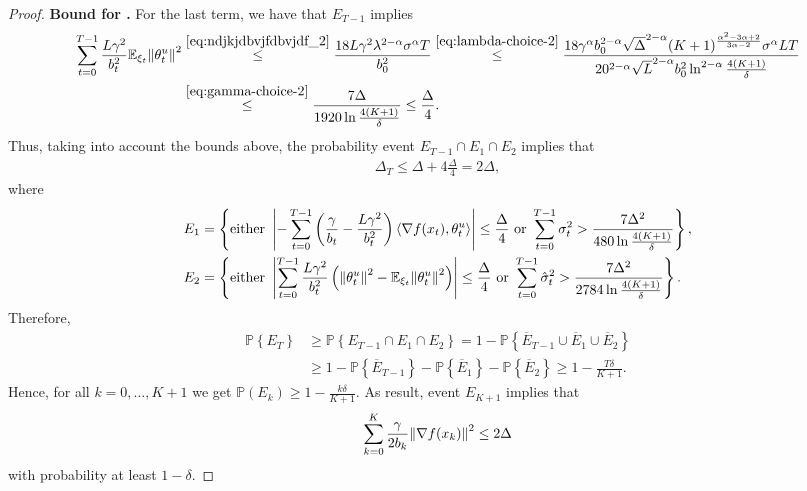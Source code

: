 \documentclass{article}
\begin{document}
\begin{proof}
    \textbf{Bound for \circledFour.} For the last term, we have that $E_{T-1}$ implies
    \begin{align*}
        \sum\limits_{t=0}^{T-1}\frac{L\gamma^2}{b_t^2} {\mathbb E}_{\xi_t}{\left\lVert\theta_t^u\right\rVert}^2 &\overset{\eqref{eq:ndjkjdbvjfdbvjdf_2}}{\leq} \frac{18L\gamma^2\lambda^{2 - \alpha}\sigma^\alpha T}{b_0^2} \overset{\eqref{eq:lambda-choice-2}}{\leq} \frac{18\gamma^\alpha b_0^{2-\alpha}\sqrt{\Delta}^{2-\alpha}(K+1)^{\frac{\alpha^2 - 3\alpha +2}{3\alpha -2}}\sigma^\alpha LT}{20^{2-\alpha}\sqrt{L}^{2 - \alpha}b_0^2 \ln^{2-\alpha}\frac{4(K+1)}{\delta}} \\
        &\overset{\eqref{eq:gamma-choice-2}}{\leq} 
        \frac{7\Delta}{1920\ln\frac{4(K+1)}{\delta}} \leq \frac{\Delta}{4}.
    \end{align*}
    Thus, taking into account the bounds above, the probability event $E_{T-1} \cap E_1 \cap E_2$ implies that
    \begin{align*}
       \Delta_T \leq \Delta + 4\frac{\Delta}{4} = 2\Delta,
    \end{align*}
    where
    \begin{align*}
        E_1 &= \left\{\text{either }\left|- \sum\limits_{t=0}^{T-1}\left(\frac{\gamma}{b_t} - \frac{L\gamma^2}{b_t^2}\right)\left \langle \nabla f(x_t), \theta_t^u \right \rangle\right| \leq \frac{\Delta}{4} \text{ or } \sum\limits_{t=0}^{T-1} \sigma_t^2 > \frac{7\Delta^2}{480\ln\frac{4(K+1)}{\delta}}\right\},\\
        E_2 &= \left\{\text{either }\left|\sum\limits_{t=0}^{T-1}\frac{L\gamma^2}{b_t^2}\left({\left\lVert\theta_t^u\right\rVert}^2 - {\mathbb E}_{\xi_t}{\left\lVert\theta_t^u\right\rVert}^2\right)\right| \leq \frac{\Delta}{4} \text{ or } \sum\limits_{t=0}^{T-1} \hat{\sigma}_t^2 > \frac{7\Delta^2}{2784\ln\frac{4(K+1)}{\delta}}\right\}.
    \end{align*}
    Therefore, 
    \begin{align*}
        \mathbb{P}\left\{E_T\right\} &\geq \mathbb{P}\left\{E_{T-1} \cap E_1 \cap E_2\right\}  = 1 - \mathbb{P}\left\{\overline{E}_{T-1} \cup \overline{E}_1 \cup \overline{E}_2\right\} \\&\geq 1 - \mathbb{P}\left\{\overline{E}_{T-1}\right\} - \mathbb{P}\left\{\overline{E}_1\right\} - \mathbb{P}\left\{\overline{E}_2\right\} \geq 1 - \frac{T\delta}{K+1}.
    \end{align*}
    Hence, for all $k = 0, \ldots, K+1$ we get $\mathbb{P}(E_k) \geq 1 - \frac{k\delta}{K+1}$. As  result, event $E_{K+1}$ implies that 
    \begin{align}
    \label{eq:total-nonconvex}
         \sum\limits_{k=0}^{K}\frac{\gamma}{2b_k}{\left\lVert\nabla f(x_k)\right\rVert}^2 \leq 2\Delta
    \end{align}
    with probability at least $1 - \delta$.


\end{proof}
\end{document}

